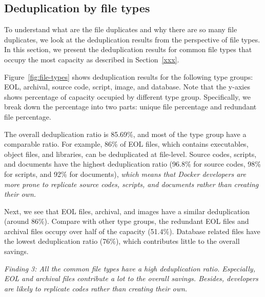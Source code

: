 \subsection{Deduplication by file types}


To understand what are the file duplicates and why there are so many file duplicates, we look at the deduplication results from the perspective of file types. In this section, we present the deduplication results for common file types that occupy the most capacity as described in Section~\ref{xxx}.

Figure~\ref{fig:file-types} shows deduplication results for 
the following type groups: EOL, archival, source code, script, image, and database. Note that the y-axies shows percentage of capacity occupied by different type group. Specifically, we break down the percentage into two parts: unique file percentage and redundant file percentage.

The overall deduplication ratio is 85.69\%, and most of the type group have a comparable ratio. For example, 86\% of EOL files, which contains executables, object files, and libraries, can be deduplicated at file-level.
Source codes, scripts, and documents have the highest deduplication ratio (96.8\% for source codes, 98\% for scripts, and 92\% for documents), \textit{which means that Docker developers are more prone to replicate source codes, scripts, and documents rather than creating their own.}

Next, we see that EOL files, archival, and images have a similar deduplication (around 86\%). Compare with other type groups, the redundant EOL files and archival files occupy over half of the capacity (51.4\%). 
Database related files have the lowest deduplication ratio (76\%), which contributes little to the overall savings.

\textit{Finding 3: All the common file types have a high deduplication ratio.
Especially,
EOL and archival files contribute a lot to the overall savings.
Besides, developers are likely to replicate codes rather than creating their own.}
 
